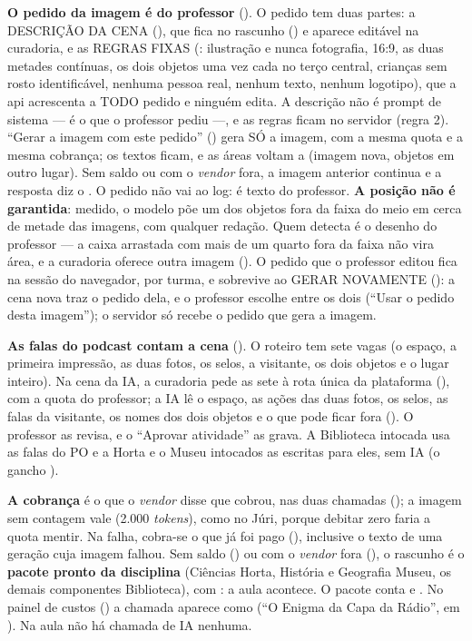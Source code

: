 \textbf{O pedido da imagem é do professor} (). O pedido tem
duas partes: a DESCRIÇÃO DA CENA (), que fica no rascunho
() e aparece editável na
curadoria, e as REGRAS FIXAS (: ilustração e nunca
fotografia, 16:9, as duas metades contínuas, os dois objetos uma vez cada no
terço central, crianças sem rosto identificável, nenhuma pessoa real, nenhum
texto, nenhum logotipo), que a api acrescenta a TODO pedido e ninguém edita.
A descrição não é prompt de sistema --- é o que o professor pediu ---, e as
regras ficam no servidor (regra 2). \enquote{Gerar a imagem com este pedido}
() gera SÓ a imagem, com a mesma quota
e a mesma cobrança; os textos ficam, e as áreas voltam a  (imagem
nova, objetos em outro lugar). Sem saldo ou com o \emph{vendor} fora, a
imagem anterior continua e a resposta diz o . O pedido não vai
ao log: é texto do professor. \textbf{A posição não é garantida}: medido, o
modelo põe um dos objetos fora da faixa do meio em cerca de metade das
imagens, com qualquer redação. Quem detecta é o desenho do professor --- a
caixa arrastada com mais de um quarto fora da faixa não vira área, e a
curadoria oferece outra imagem (). O pedido que o professor
editou fica na sessão do navegador, por turma, e sobrevive ao GERAR NOVAMENTE
(): a cena nova traz o pedido dela, e o professor escolhe entre
os dois (\enquote{Usar o pedido desta imagem}); o servidor só recebe o pedido
que gera a imagem.

\textbf{As falas do podcast contam a cena} (). O roteiro tem
sete vagas (o espaço, a primeira impressão, as duas fotos, os selos, a
visitante, os dois objetos e o lugar inteiro). Na cena da IA, a curadoria pede
as sete à rota única  da plataforma (),
com a quota do professor; a IA lê o espaço, as ações das duas fotos, os selos,
as falas da visitante, os nomes dos dois objetos e o que pode ficar fora
(). O professor as revisa, e o \enquote{Aprovar
atividade} as grava. A Biblioteca intocada usa as falas do PO e a Horta e o
Museu intocados as escritas para eles, sem IA (o gancho ).

\textbf{A cobrança} é o que o \emph{vendor} disse que cobrou, nas duas
chamadas (); a imagem sem contagem vale
 (2.000 \emph{tokens}), como no Júri, porque
debitar zero faria a quota mentir. Na falha, cobra-se o que já foi pago
(), inclusive o texto de uma geração cuja imagem falhou. Sem saldo
() ou com o \emph{vendor} fora (),
o rascunho é o \textbf{pacote pronto da disciplina} (Ciências \seta{} Horta,
História e Geografia \seta{} Museu, os demais componentes \seta{}
Biblioteca), com : a aula acontece. O pacote conta
 e . No painel de custos () a
chamada aparece como  (\enquote{O Enigma da Capa da Rádio}, em
). Na aula não há chamada de IA nenhuma.

